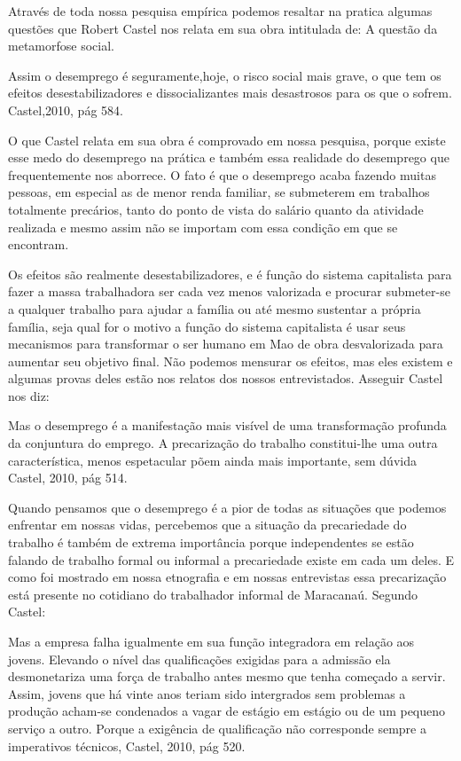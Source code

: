 Através de toda nossa pesquisa empírica podemos resaltar na pratica algumas 
questões que Robert Castel nos relata em sua obra intitulada de: A questão da 
metamorfose social.

\begin{citacao}
Assim o desemprego é seguramente,hoje, o risco social mais grave, o que tem os 
efeitos desestabilizadores e dissocializantes mais desastrosos para os que o 
sofrem. Castel,2010, pág 584. 
\end{citacao}

O que Castel relata em sua obra é comprovado em nossa pesquisa, porque existe 
esse medo do desemprego na prática e também essa realidade do desemprego que 
frequentemente nos aborrece. O fato é que o desemprego acaba fazendo muitas 
pessoas, em especial as de menor renda familiar, se submeterem em trabalhos 
totalmente precários, tanto do ponto de vista do salário quanto da atividade 
realizada e mesmo assim não se importam com essa condição em que se encontram.

Os efeitos são realmente desestabilizadores, e é função do sistema capitalista 
para fazer a massa trabalhadora ser cada vez menos valorizada e procurar 
submeter-se a qualquer trabalho para ajudar a família ou até mesmo sustentar a 
própria família, seja qual for o motivo a função do sistema capitalista é usar 
seus mecanismos para transformar o ser humano em Mao de obra desvalorizada para 
aumentar seu objetivo final. Não podemos mensurar os efeitos, mas eles existem e 
algumas provas deles estão nos relatos dos nossos entrevistados. Asseguir Castel 
nos diz:

\begin{citacao}
Mas o desemprego é a manifestação mais visível de uma transformação profunda da 
conjuntura do emprego. A precarização do trabalho constitui-lhe uma outra 
característica, menos espetacular põem ainda mais importante, sem dúvida Castel, 
2010, pág 514.
\end{citacao}

Quando pensamos que o desemprego é a pior de todas as situações que podemos 
enfrentar em nossas vidas, percebemos que a situação da precariedade do trabalho 
é também de extrema importância porque independentes se estão falando de 
trabalho formal ou informal a precariedade existe em cada um deles. E como foi 
mostrado em nossa etnografia e em nossas entrevistas essa precarização está 
presente no cotidiano do trabalhador informal de Maracanaú. Segundo Castel:

\begin{citacao}
Mas a empresa falha igualmente em sua função integradora em relação aos jovens. 
Elevando o nível das qualificações exigidas para a admissão ela desmonetariza 
uma força de trabalho antes mesmo que tenha começado a servir. Assim, jovens que 
há vinte anos teriam sido intergrados sem problemas a produção acham-se 
condenados a vagar de estágio em estágio ou de um pequeno serviço a outro. 
Porque a exigência de qualificação não corresponde sempre a imperativos 
técnicos, Castel, 2010, pág 520. 
\end{citacao}

